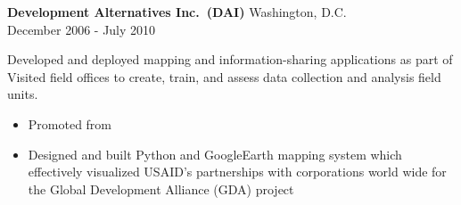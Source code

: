 \documentclass[letterpaper]{article}
\begin{document}
\textbf{Development Alternatives Inc.~(DAI)} 
    \hfill Washington, D.C.\\
    \hfill December 2006 - July 2010\\
\vspace{1mm}

Developed and deployed mapping and information-sharing applications as part of
Visited field offices to create, train, and assess data collection and analysis
field units.

\vspace{-1mm}
\begin{itemize} \itemsep 0pt
    \item Promoted from


    \item Designed and built Python and GoogleEarth mapping system which
    effectively visualized USAID's partnerships with corporations world wide for
    the Global Development Alliance (GDA) project


\end{itemize}
\vspace{1mm}
\end{document}
